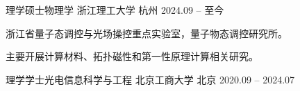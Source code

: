 
\begin{cventries}
  \cventry
    {理学硕士\enskip 物理学}
    {浙江理工大学}
    {杭州}
    {2024.09 -- 至今}
    {
      \begin{cvitems}
        \item {浙江省量子态调控与光场操控重点实验室，量子物态调控研究所。}
        \item {主要开展计算材料、拓扑磁性和第一性原理计算相关研究。}
      \end{cvitems}
    }

  \cventry
    {理学学士\enskip 光电信息科学与工程}
    {北京工商大学}
    {北京}
    {2020.09 -- 2024.07}
    {}
\end{cventries}
